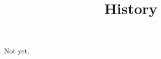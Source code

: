 \documentclass{ximera}
\title{History}
\begin{document}
\begin{abstract}
\end{abstract}
\maketitle

Not yet.
\end{document}
